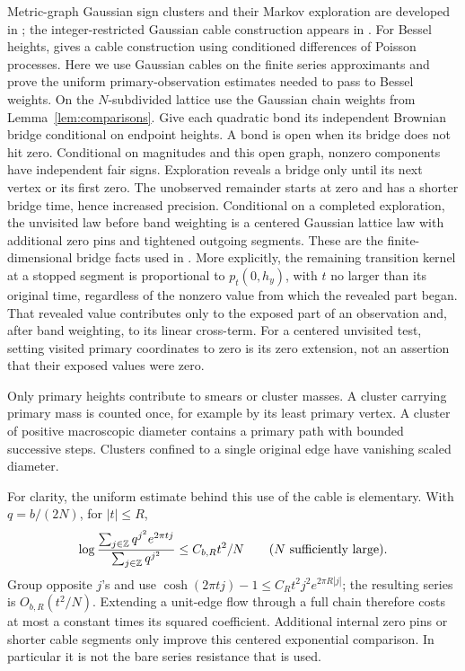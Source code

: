 Metric-graph Gaussian sign clusters and their Markov exploration
are developed in \cite[Section~3 and Lemma~3.2]{Lupu2016}; the
integer-restricted Gaussian cable construction appears in
\cite[Section~7, Proposition~7.1]{AHPS2022}. For Bessel heights,
\cite[Section~2.2, Remark~1]{vEL} gives a cable construction
using conditioned differences of Poisson processes. Here we use
Gaussian cables on the finite series approximants and prove the
uniform primary-observation estimates needed to pass to Bessel
weights. On the \(N\)-subdivided lattice use the Gaussian chain
weights from Lemma~\ref{lem:comparisons}. Give each quadratic
bond its independent Brownian bridge conditional on endpoint
heights. A bond is open when its bridge does not hit zero.
Conditional on magnitudes and this open graph, nonzero
components have independent fair signs. Exploration reveals a
bridge only until its next vertex or its first zero. The
unobserved remainder starts at zero and has a shorter bridge
time, hence increased precision. Conditional on a completed
exploration, the unvisited law before band weighting is a
centered Gaussian lattice law with additional zero pins and
tightened outgoing segments. These are the finite-dimensional
bridge facts used in .
More explicitly, the remaining transition kernel at a stopped
segment is proportional to \(p_t(0,h_y)\), with \(t\) no larger
than its original time, regardless of the nonzero value from
which the revealed part began. That revealed value contributes
only to the exposed part of an observation and, after band
weighting, to its linear cross-term. For a centered unvisited
test, setting visited primary coordinates to zero is its zero
extension, not an assertion that their exposed values were zero.

Only primary heights contribute to smears or cluster masses.
A cluster carrying primary mass is counted once, for example by
its least primary vertex. A cluster of positive macroscopic
diameter contains a primary path with bounded successive steps.
Clusters confined to a single original edge have vanishing
scaled diameter.

For clarity, the uniform estimate behind this use of the cable
is elementary. With \(q=b/(2N)\), for \(|t|\le R\),
\begin{equation}
 \log\frac{\sum_{j\in\mathbb Z}q^{j^2}e^{2\pi tj}}
                {\sum_{j\in\mathbb Z}q^{j^2}}
       \le C_{b,R}t^2/N
       \qquad(N\hbox{ sufficiently large}).
 \label{eq:pins-chain-mgf}
\end{equation}
Group opposite \(j\)'s and use
\(\cosh(2\pi tj)-1\le C_Rt^2j^2e^{2\pi R|j|}\);
the resulting series is \(O_{b,R}(t^2/N)\).
Extending a unit-edge flow through a full chain therefore costs
at most a constant times its squared coefficient. Additional
internal zero pins or shorter cable segments only improve this
centered exponential comparison. In particular it is not the
bare series resistance that is used.


